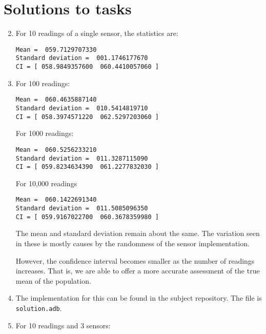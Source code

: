 \documentclass{article}
\begin{document}
%
\lstset{language=,aboveskip=3mm}

\section*{Solutions to tasks}

\begin{enumerate}

\setcounter{enumi}{1}

\item For 10 readings of a single sensor, the statistics are:

\begin{lstlisting}
Mean =  059.7129707330 
Standard deviation =  001.1746177670 
CI = [ 058.9849357600  060.4410057060 ]
\end{lstlisting}


 \item For 100 readings:

\begin{lstlisting}
Mean =  060.4635887140 
Standard deviation =  010.5414819710 
CI = [ 058.3974571220  062.5297203060 ]
\end{lstlisting}

For 1000 readings:

\begin{lstlisting}
Mean =  060.5256233210 
Standard deviation =  011.3287115090 
CI = [ 059.8234634390  061.2277832030 ]
\end{lstlisting}

For 10,000 readings

\begin{lstlisting}
Mean =  060.1422691340 
Standard deviation =  011.5085096350 
CI = [ 059.9167022700  060.3678359980 ]
\end{lstlisting}

The mean and standard deviation remain about the same. The variation seen in these is mostly causes by the randomness of the sensor implementation.

However, the confidence interval becomes smaller as the number of readings increases. That is, we are able to offer a more accurate assessment of the true mean of the population.

\item The implementation for this can be found in the subject repository. The file is \texttt{solution.adb}.

\item For 10 readings and 3 sensors:


\end{enumerate}
\end{document}
